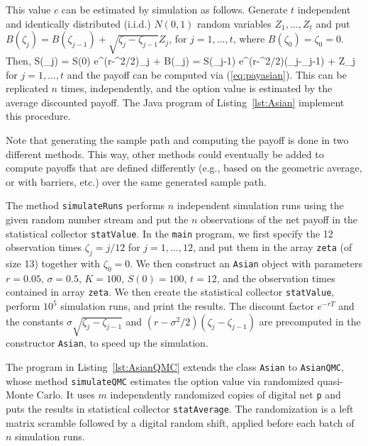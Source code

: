 This value $c$ can be estimated by simulation as follows.
Generate $t$ independent and identically distributed
(i.i.d.) $N(0,1)$ random variables $Z_1,\dots,Z_t$
and put $B(\zeta_j) = B(\zeta_{j-1}) + \sqrt{\zeta_j - \zeta_{j-1}} Z_j$,
for $j=1,\dots,t$, where $B(\zeta_0) = \zeta_0 = 0$.  Then,
\eq
  S(\zeta_j) = S(0) e^{(r-\sigma^2/2)\zeta_j + \sigma B(\zeta_j)}
             = S(\zeta_{j-1}) e^{(r-\sigma^2/2)(\zeta_j-\zeta_{j-1})
                          + \sigma {} Z_j}
                                                      \label{eq:Szetaj}
\endeq
for $j = 1,\dots,t$ and the payoff can be computed via (\ref{eq:payasian}).
This can be replicated $n$ times, independently, and the
option value is estimated by the average discounted payoff.
The Java program of Listing~\ref{lst:Asian} implement this procedure.

Note that generating the sample path and computing the payoff is done
in two different methods.  This way, other methods could eventually be
added to compute payoffs that are defined differently (e.g., based on
the geometric average, or with barriers, etc.) over the same generated
sample path.




The method \texttt{simulateRuns} performs $n$ independent simulation
runs using the given random number stream and put the $n$ observations
of the net payoff in the statistical collector \texttt{statValue}.
In the \texttt{main} program, we first specify the 12 observation
times $\zeta_j = j/12$ for $j=1,\dots,12$, and put them in the array
\texttt{zeta} (of size 13) together with $\zeta_0=0$.
We then construct an \texttt{Asian} object with parameters
$r=0.05$, $\sigma=0.5$, $K = 100$, $S(0)=100$, $t=12$, and the
observation times contained in array \texttt{zeta}.
We then create the statistical collector \texttt{statValue},
perform $10^5$ simulation runs, and print the results.
The discount factor $e^{-rT}$ and the
constants $\sigma \sqrt{\zeta_j - \zeta_{j-1}}$ and
$(r-\sigma^2/2)(\zeta_j - \zeta_{j-1})$ are precomputed in the
constructor \texttt{Asian}, to speed up the simulation.


The program in Listing~\ref{lst:AsianQMC} extends the class \texttt{Asian}
to \texttt{AsianQMC}, whose method \texttt{simulate\-QMC}
estimates the option value via randomized quasi-Monte Carlo.
It uses $m$ independently randomized copies of digital net \texttt{p}
and puts the results in statistical collector \texttt{statAverage}.
The randomization is a left matrix scramble followed by a digital
random shift, applied before each batch of $n$ simulation runs.

